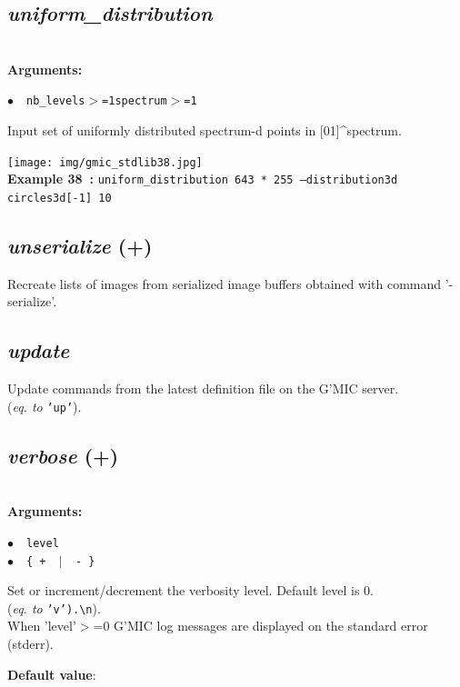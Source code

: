 \documentclass[a4paper,10.5pt,twoside]{book}
\def\comma{\discretionary{,}{}{,}}
\newcommand{\Cb}[1]{\textcolor{cb}{#1}}
\newcommand{\Cc}[1]{\textcolor{cc}{#1}}
\begin{document}
\subsection{\emph{uniform\_distribution} }\vspace*{-0.7em}
~\\\textbf{\Cb{Arguments: }}\begin{flushleft}
{\small \Cb{\hspace*{0.5cm}$\bullet$~~\texttt{nb\_levels$>$=1{\comma}spectrum$>$=1}}}\end{flushleft}
Input set of uniformly distributed spectrum-d points in [0{\comma}1]\textasciicircum spectrum.
\begin{center}\texttt{[image: img/gmic\_stdlib38.jpg]}\\
{\footnotesize \textbf{Example 38~:} \texttt{uniform\_distribution 64{\comma}3 * 255 --distribution3d circles3d[-1] 10}}
\end{center}

\subsection{\emph{unserialize} (+)}\vspace*{-0.7em}
Recreate lists of images from serialized image buffers{\comma} obtained with command '-serialize'.


\subsection{\emph{update} }\vspace*{-0.7em}
Update commands from the latest definition file on the G'MIC server.
~\\(\emph{eq. to} {\small \texttt{'up'}}).


\subsection{\emph{verbose} (+)}\vspace*{-0.7em}
~\\\textbf{\Cb{Arguments: }}\begin{flushleft}
{\small \Cb{\hspace*{0.5cm}$\bullet$~~\texttt{level}}}~~~\\
{\small \Cb{\hspace*{0.5cm}$\bullet$~~\texttt{\{ + ~$|$~ - \}}}}\end{flushleft}
Set or increment/decrement the verbosity level. Default level is 0.
~\\(\emph{eq. to} {\small \texttt{'v').\textbackslash n}}).
~\\When 'level'$>$=0{\comma} G'MIC log messages are displayed on the standard error (stderr).
\begin{flushleft}\Cc{\textbf{Default value}:\\~\\\hspace*{0.5cm}{\small $\bullet$~~\texttt{'level=0'.}}}\end{flushleft}
\end{document}
